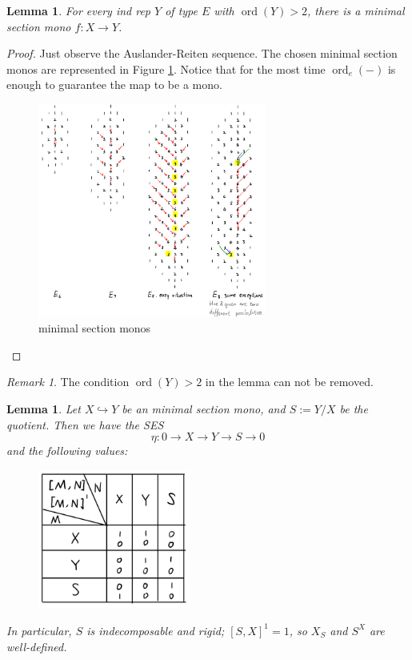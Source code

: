 \documentclass[reqno,11pt]{amsart}
\numberwithin{equation}{section}
\theoremstyle{plain}
\newtheorem{lemma}[theorem]{Lemma}
\theoremstyle{plain}
\numberwithin{equation}{section}
\theoremstyle{remark}
\newtheorem{remark}[theorem]{Remark}
\newcommand{\ord}{\operatorname{ord}}
\newcommand{\orde}{\operatorname{ord}_e }
\begin{document}
\begin{lemma}
	For every ind rep $Y$ of type $E$ with $\ord(Y)>2$, there is a minimal section mono $f:X \longrightarrow Y$.
\end{lemma}
\begin{proof}
	Just observe the Auslander-Reiten sequence. The chosen minimal section monos are represented in Figure \ref{fig:minisecmono}. Notice that for the most time $\orde(-)$ is enough to guarantee the map to be a mono.
	\begin{center}
		\begin{figure}[ht]\label{fig:minisecmono}
			\vspace{0cm}
			\centering
			\includegraphics[width=7.5cm]{figures/minisecmono.png}
			\caption{minimal section monos}
		\end{figure}
	\end{center}
\end{proof}
\begin{remark}
	The condition $\ord(Y)>2$ in the lemma can not be removed.
\end{remark}
\begin{lemma}\label{lem:value}
Let $X \hookrightarrow Y$ be an minimal section mono, and $S:=Y/X$ be the quotient. Then we have the SES 
$$\eta: 0 \longrightarrow X \longrightarrow Y \longrightarrow S \longrightarrow 0$$
and the following values:

\begin{center}
	\begin{figure}[ht]\label{fig:table}
		\vspace{0cm}
		\centering
		\includegraphics[width=5cm]{figures/table.png}
	\end{figure}
\end{center}

In particular, $S$ is indecomposable and rigid; $[S,X]^1 =1$, so $X_S$ and $S^X$ are well-defined.
\end{lemma}
\end{document}
